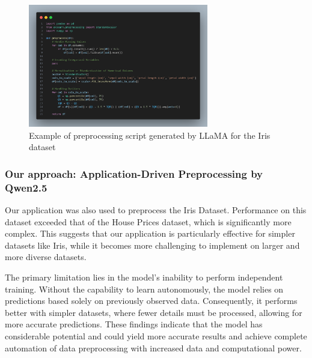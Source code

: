 \begin{figure}[H]
    \centering
    \includegraphics[width=0.7\textwidth]{media/IrisCode.png}
    \caption{Example of preprocessing script generated by LLaMA for the Iris dataset}
    \label{fig:llama-code-iris}
\end{figure}

\subsubsection{Our approach: Application-Driven Preprocessing by Qwen2.5}

Our application was also used to preprocess the Iris Dataset. Performance on
this dataset exceeded that of the House Prices dataset, which is significantly
more complex. This suggests that our application is particularly effective for
simpler datasets like Iris, while it becomes more challenging to implement on
larger and more diverse datasets.

The primary limitation lies in the model's inability to perform independent
training. Without the capability to learn autonomously, the model relies on
predictions based solely on previously observed data. Consequently, it performs
better with simpler datasets, where fewer details must be processed, allowing
for more accurate predictions. These findings indicate that the model has
considerable potential and could yield more accurate results and achieve
complete automation of data preprocessing with increased data and computational
power.

